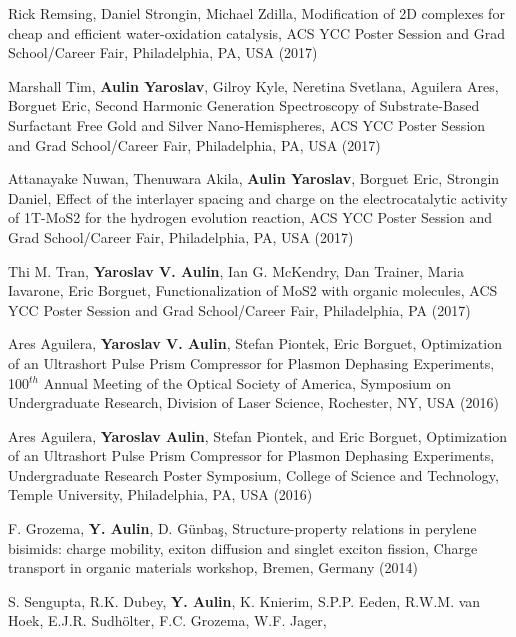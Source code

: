 \documentclass[11pt,letterpaper,sans]{moderncv} %
\begin{document}
\begin{etaremune}
             Rick Remsing, Daniel Strongin, Michael Zdilla, Modification of 2D 
             complexes for cheap and efficient water-oxidation catalysis,
             ACS YCC Poster Session and Grad School/Career Fair, Philadelphia, PA, USA (2017)
       \item Marshall Tim, \textbf{Aulin Yaroslav}, Gilroy Kyle, Neretina Svetlana, 
             Aguilera Ares, Borguet Eric, Second Harmonic Generation Spectroscopy 
             of Substrate-Based Surfactant Free Gold and Silver Nano-Hemispheres,
             ACS YCC Poster Session and Grad School/Career Fair, Philadelphia, PA, USA (2017)
       \item Attanayake Nuwan, Thenuwara Akila, \textbf{Aulin Yaroslav}, Borguet Eric,
             Strongin Daniel, Effect of the interlayer spacing and charge on the
             electrocatalytic activity of 1T-MoS2 for the hydrogen evolution reaction,
             ACS YCC Poster Session and Grad School/Career Fair, Philadelphia, PA, USA (2017)
       \item Thi M. Tran, \textbf{Yaroslav V. Aulin}, Ian G. McKendry,
             Dan Trainer, Maria Iavarone, Eric Borguet,
             Functionalization of MoS2 with organic molecules,
             ACS YCC Poster Session and Grad School/Career Fair, Philadelphia, PA (2017)
       \item Ares Aguilera, \textbf {Yaroslav V. Aulin}, Stefan Piontek, Eric Borguet,
             Optimization of an Ultrashort Pulse Prism Compressor for Plasmon Dephasing
             Experiments, 100$^{th}$ Annual Meeting of the Optical Society of
             America, Symposium on Undergraduate Research, Division of Laser Science, Rochester,
             NY, USA (2016)
       \item Ares Aguilera, \textbf{Yaroslav Aulin}, Stefan Piontek, and Eric Borguet,
             Optimization of an Ultrashort Pulse Prism Compressor for Plasmon Dephasing 
             Experiments, Undergraduate Research Poster Symposium, College of Science and
             Technology, Temple University, Philadelphia, PA, USA (2016)
       \item F. Grozema, \textbf{Y. Aulin}, D. Günbaş, 
             Structure-property relations in perylene bisimids: charge mobility,
             exiton diffusion and singlet exciton fission, 
             Charge transport in organic materials workshop, Bremen,
             Germany (2014)
       \item S. Sengupta, R.K. Dubey, \textbf{Y. Aulin}, K. Knierim, 
             S.P.P. Eeden, R.W.M. van Hoek, E.J.R. Sudhölter, F.C. Grozema, W.F. Jager, 

\end{etaremune}
\end{document}
